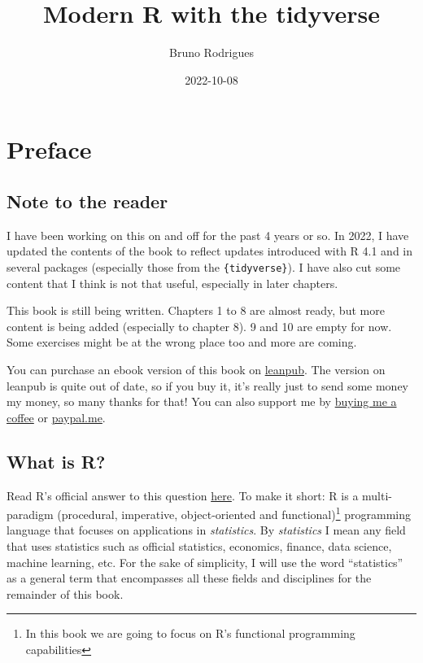 \documentclass[
]{article}
\title{Modern R with the tidyverse}
\author{Bruno Rodrigues}
\date{2022-10-08}
\begin{document}
\maketitle

{
\setcounter{tocdepth}{2}
\tableofcontents
}
\hypertarget{preface}{%
\section*{Preface}\label{preface}}

\hypertarget{note-to-the-reader}{%
\subsection*{Note to the reader}\label{note-to-the-reader}}

I have been working on this on and off for the past 4 years or so. In 2022, I have updated the
contents of the book to reflect updates introduced with R 4.1 and in several packages (especially
those from the \texttt{\{tidyverse\}}). I have also cut some content that I think is not that useful,
especially in later chapters.

This book is still being written. Chapters 1 to 8 are almost ready, but more content is being added
(especially to chapter 8). 9 and 10 are empty for now. Some exercises might be at the wrong place
too and more are coming.

You can purchase an ebook version of this book on \href{https://leanpub.com/modern_tidyverse}{leanpub}.
The version on leanpub is quite out of date, so if you buy it, it's really just to send some money
my money, so many thanks for that! You can also support me by \href{https://www.buymeacoffee.com/brodriguesco}{buying me a
coffee} or
\href{https://www.paypal.me/brodriguesco}{paypal.me}.

\hypertarget{what-is-r}{%
\subsection*{What is R?}\label{what-is-r}}

Read R's official answer to this question
\href{https://cran.r-project.org/doc/FAQ/R-FAQ.html\#What-is-R_003f}{here}. To make it short: R is a
multi-paradigm (procedural, imperative, object-oriented and functional)\footnote{In this book we are going
  to focus on R's functional programming capabilities} programming language that
focuses on applications in \emph{statistics}. By \emph{statistics} I mean any field that uses statistics such
as official statistics, economics, finance, data science, machine learning, etc. For the sake of
simplicity, I will use the word ``statistics'' as a general term that encompasses all these fields and
disciplines for the remainder of this book.
\end{document}
